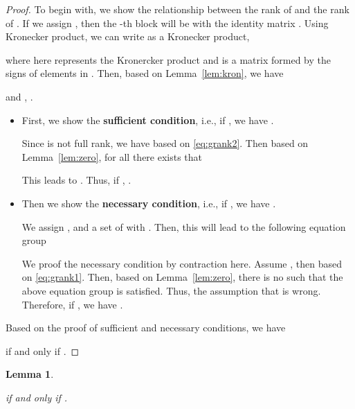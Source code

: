 \documentclass[10pt,journal,compsoc]{IEEEtran}
\newtheorem{lemma}{Lemma}
\begin{document}
\begin{proof}
To begin with, 
we show the 
relationship between the rank of 
and the rank of .
If we assign ,
then the -th block will be 
with the identity matrix .
Using Kronecker product,
we can write  as a Kronecker product,

where  here represents the Kronercker product 
and  is a  matrix formed by the signs of elements in  .
Then, 
based on Lemma~\ref{lem:kron},
we have 

and
,
.


\begin{itemize}[leftmargin=*]
\item 	
First, we show the \textbf{sufficient condition},
i.e.,
if , 
we have
.

Since  is not full rank,
we have 
based on \eqref{eq:grank2}.
Then based on Lemma~\ref{lem:zero},	
for all 
there exists 
that 

This leads to .
Thus, 
if ,
.

\item
Then we show the
\textbf{necessary condition},
i.e.,
if ,
we have
.

We assign
,
and a set of  with .
Then, 
this will lead to the following equation group


We proof the necessary  condition by contraction here.
Assume , then 
based on \eqref{eq:grank1}.
Then, based on Lemma~\ref{lem:zero},
there is no  such that 
the above equation group is satisfied.
Thus, 
the assumption that  is wrong.
Therefore,
if ,
we have
.
\end{itemize}

Based on the proof of sufficient and necessary conditions,
we have

if and only if .
\end{proof}


\begin{lemma}
	\label{lem:case2}
	
	if and only if 
	.
\end{lemma}
\end{document}
